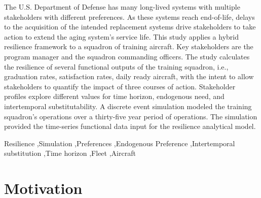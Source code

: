 \documentclass[preprint,12pt]{elsarticle}
\begin{document}
\begin{frontmatter}
\begin{abstract}
\end{abstract}
The U.S. Department of Defense has many long-lived  systems with
multiple stakeholders with different preferences. As these systems
reach end-of-life, delays to the acquisition of the intended replacement systems drive
stakeholders to take action to extend the aging system's service life.
This study applies a hybrid resilience framework to a squadron of
training aircraft. Key stakeholders are the program manager and the
squadron commanding officers. The study calculates the resilience of
several functional outputs of the training squadron, i.e., graduation rates,
satisfaction rates, daily ready 
aircraft,  with the intent to allow stakeholders to quantify the
impact of three courses of action. Stakeholder profiles explore
different values for time horizon, endogenous need, and intertemporal
substitutability. %
A discrete event
simulation modeled the training squadron's operations over a
thirty-five year period of operations. The simulation provided the
time-series functional data input for the resilience analytical model.  

\begin{keyword}
Resilience \sep Simulation \sep Preferences \sep Endogenous Preference
\sep Intertemporal substitution \sep Time horizon \sep Fleet \sep Aircraft


\end{keyword}

\end{frontmatter}

\linenumbers

\section{Motivation}
\label{S:1}
\end{document}
